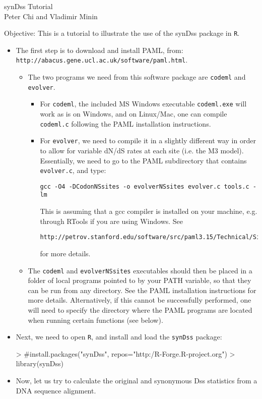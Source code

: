\documentclass[notitlepage]{article}
\begin{document}
\begin{flushleft} 
synDss Tutorial \\
Peter Chi and Vladimir Minin \\
\end{flushleft}

Objective: This is a tutorial to illustrate the use of the synDss package in {\tt{R}}. 

\begin{itemize}
\item The first
step is to download and install PAML, from:  
{\tt{http://abacus.gene.ucl.ac.uk/software/paml.html}}. 
\begin{itemize}
\item The two programs we need
from this software package are {\tt{codeml}} and {\tt{evolver}}. 
\begin{itemize}
\item For {\tt{codeml}}, the included MS Windows executable {\tt{codeml.exe}} will work as is on Windows,
and on Linux/Mac, one can compile {\tt{codeml.c}} following the PAML installation instructions.
\item For {\tt{evolver}}, we need
to compile it in a slightly different way in order to allow for variable dN/dS rates at
each site (i.e. the M3 model). Essentially, we need to go to the PAML subdirectory that contains {\tt{evolver.c}},
and type:
\begin{verbatim}
gcc -O4 -DCodonNSsites -o evolverNSsites evolver.c tools.c -lm
\end{verbatim}
This is assuming that a gcc compiler is installed on your machine, e.g. through RTools if you are using Windows.
See 
\begin{verbatim}
http://petrov.stanford.edu/software/src/paml3.15/Technical/Simulation/Codon/CodonSimulation.txt
\end{verbatim} 
for more details.

\end{itemize}
\item The {\tt{codeml}} and {\tt{evolverNSsites}} executables should then be placed in a folder of 
local programs pointed to by your PATH variable,
so that they can be run from any directory. See the PAML installation instructions for more details. Alternatively,
if this cannot be successfully performed, one will need to specify the directory where the PAML programs
are located when running certain functions (see below).

\end{itemize}


\item Next, we need to open {\tt{R}}, and install and load the {\tt{synDss}} package:
\begin{Schunk}
\begin{Sinput}
> #install.packages("synDss", repos="http:/R-Forge.R-project.org")
> library(synDss)
\end{Sinput}
\end{Schunk}

\item Now, let us try to calculate the original and synonymous Dss statistics from a DNA sequence
alignment. 

\end{itemize}
\end{document}
